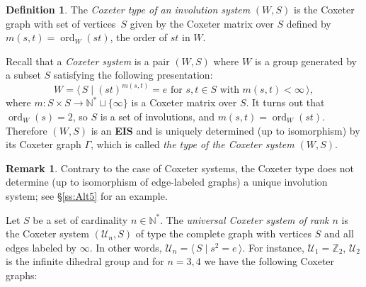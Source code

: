 \documentclass[A4paper, oneside]{amsart}
\newcommand{\mpair}[1]{\langle\, #1\,\rangle}  %
\newcommand{\ord}{\operatorname{ord}}
\newcommand{\U}{\mathcal{U}}
\newcommand{\EIS}{\textnormal{\bf EIS}\xspace}
\theoremstyle{definition}
\newtheorem{rem}[thm]{Remark}
\newtheorem{defi}[thm]{Definition}
\begin{document}
\begin{defi}\label{def:CoxeterGraphIS} The {\em Coxeter type of an involution system} $(W,S)$ is the Coxeter graph with set of vertices~$S$ given by the Coxeter matrix over $S$ defined by $m(s,t)=\ord_W(st)$, the order of $st$ in $W$. 
\end{defi}

Recall that a {\em Coxeter system} is a pair $(W,S)$ where  $W$ is a group generated by a subset $S$ satisfying the following presentation: 
 $$
 W=\mpair{S\mid (st)^{m(s,t)}=e \text{ for }s,t\in S\text{ with }m(s,t)<\infty },
 $$
 where $m:S\times S \to \mathbb N^*\sqcup\{\infty\}$ is a Coxeter matrix over $S$.  
 It turns out that $\ord_W(s)=2$, so $S$ is a set of involutions, and $m(s,t)=\ord_W(st)$. Therefore $(W,S)$ is an \EIS and is uniquely determined (up to isomorphism) by its Coxeter graph $\Gamma$, which is called {\em the type of the Coxeter system $(W,S)$}.

\begin{rem} Contrary to the case of Coxeter systems, the Coxeter type does not determine (up to isomorphism of edge-labeled graphs) a unique involution system; see \S\ref{ss:Alt5} for an example. 
\end{rem}

\smallskip
Let $S$ be a set of cardinality $n\in\mathbb N^*$. The {\em universal Coxeter system of rank $n$} is the Coxeter system $(\mathcal U_n,S)$ of type the complete graph with vertices $S$ and all edges labeled by $\infty$. In other words, 
$
\mathcal U_n=\mpair{S\mid s^2=e}.
$
For instance, $\mathcal U_1=\mathbb Z_2$, $\mathcal U_2$ is the infinite dihedral group and for $n=3,4$ we have the following Coxeter graphs:
\smallskip

\begin{center}
\end{center}
\end{document}
